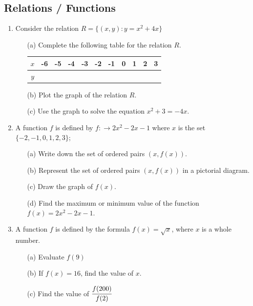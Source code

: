 	\subsection{Relations / Functions}
\begin{enumerate}


			\subsubsection{Graphs, Domain, Range}

	\item Consider the relation $R = \{(x,y): y = x^2 + 4x\}$
		\begin{itemize}
		\item[(a)] Complete the following table for the relation $R$.\\
		\begin{tabular}{|c|c|c|c|c|c|c|c|c|c|c|} \hline
		$x$ &-6&-5&-4&-3&-2&-1&0&1&2&3 \\ \hline
		$y$ &&&&&&&&&& \\ \hline
		\end{tabular}
		\item[(b)] Plot the graph of the relation $R$.
		\item[(c)] Use the graph to solve the equation $x^2 + 3 = -4x$.
		\end{itemize}
		
	

		
	\item A function $f$ is defined by $f: \rightarrow 2x^2 - 2x - 1$ where $x$ is the set $\{-2, -1, 0, 1, 2, 3\}$;
		\begin{itemize}
		\item[(a)] Write down the set of ordered pairs $(x, f(x))$.
		\item[(b)] Represent the set of ordered pairs $(x, f(x))$ in a pictorial diagram.
		\item[(c)] Draw the graph of $f(x)$.
		\item[(d)] Find the maximum or minimum value of the function $f(x) = 2x^2 - 2x - 1$.
		\end{itemize}

	\item A function $f$ is defined by the formula $f(x) = \sqrt{x}$, where $x$ is a whole number.
		\begin{itemize}
		\item[(a)] Evaluate $f(9)$
		\item[(b)] If $f(x) = 16$, find the value of $x$.
		\item[(c)] Find the value of $\cfrac{f(200)}{f(2)}$
		\end{itemize}		
		

\end{enumerate}
